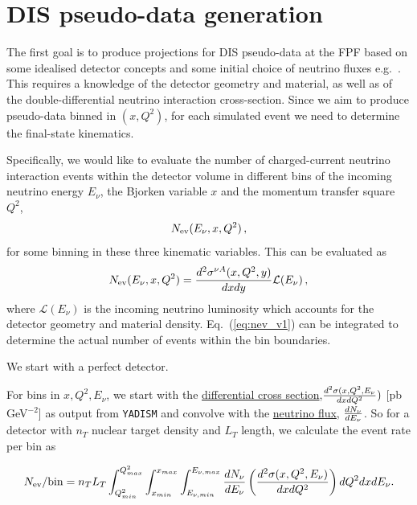 \documentclass[11pt,a4paper]{article}
\def\frac#1#2{{{#1}\over {#2}}}
\numberwithin{equation}{section}
\numberwithin{figure}{section}
\numberwithin{table}{section}
\begin{document}
\section{DIS pseudo-data generation}
\label{sec:pseudo-data_generation}

The first goal is to produce projections
for DIS pseudo-data at the FPF based on
some idealised detector concepts and
some initial choice of neutrino fluxes
e.g.~\cite{Kling:2021gos}.
%
This requires a knowledge of the detector geometry
and material, as well as of the double-differential
neutrino interaction cross-section. 
%
Since we aim to produce pseudo-data binned in $(x,Q^2)$,
for each simulated event we need to determine the 
final-state kinematics. 

Specifically, we would like to evaluate the
number of charged-current neutrino interaction events
within the detector volume in different bins
of the incoming neutrino energy $E_\nu$, the Bjorken
variable $x$ and the momentum transfer square $Q^2$,
\begin{equation}
    N_{\rm ev}(E_\nu, x, Q^2) \, ,
\end{equation}
for some binning in these three kinematic variables.
%
This can be evaluated as
\begin{equation}
\label{eq:nev_v1}
    N_{\rm ev}(E_\nu, x, Q^2) =  \frac{d^2\sigma^{\nu A}(x,Q^2,y)}{dxdy} \mathcal{L}(E_{\nu}) \, ,
\end{equation}
where $\mathcal{L}(E_{\nu}) $ is the incoming neutrino
luminosity which accounts for the detector geometry
and material density. 
%
Eq.~(\ref{eq:nev_v1}) can be integrated to
determine the actual number of events within
the bin boundaries.

We start with a perfect detector.


For bins in $x,Q^2,E_{\nu}$, we start with the \href{https://github.com/juanrojochacon/FPF-WG1/blob/main/results/diff_xsecs_a1.txt}{differential cross section},$\frac{d^2\sigma(x,Q^2,E_{\nu}}{dxdQ^2})$ [pb GeV$^{-2}$] as output from {\tt YADISM} and convolve with the \href{https://github.com/KlingFelix/FastNeutrinoFluxSimulation/tree/main/Fluxes}{neutrino flux}, $\frac{dN_{\nu}}{dE_{\nu}}$. So for a detector with $n_T$ nuclear target density and $L_T$ length, we calculate the event rate per bin as

\begin{equation}
    N_{\rm ev}/{\rm bin} = n_T L_T\int_{Q^2_{min}}^{Q^2_{max}}\int_{x_{min}}^{x_{max}}\int_{E_{\nu,min}}^{E_{\nu , max}} \frac{dN_{\nu}}{dE_{\nu}}\left(\frac{d^2\sigma(x,Q^2,E_{\nu})}{dxdQ^2}\right) dQ^2 dx dE_{\nu}.
\end{equation}
\end{document}
